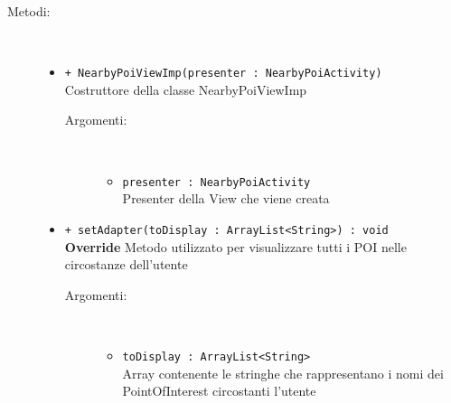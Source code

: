 \documentclass[../DefinizioneDiProdotto.tex]{subfiles}
\begin{document}
\begin{description}
\begin{itemize}
	\end{itemize}
	\item[Metodi:] \
	\begin{itemize}
		\item \texttt{+ NearbyPoiViewImp(presenter : NearbyPoiActivity)}\\
		Costruttore della classe NearbyPoiViewImp
		\begin{description}
			\item[Argomenti:] \
			\begin{itemize}
				\item \texttt{presenter : NearbyPoiActivity}\\
				Presenter della View che viene creata\end{itemize}
		\end{description}
		\item \texttt{+ setAdapter(toDisplay : ArrayList<String>) : void}\\
		\textbf{Override} Metodo utilizzato per visualizzare tutti i POI nelle circostanze dell'utente
		\begin{description}
			\item[Argomenti:] \
			\begin{itemize}
				\item \texttt{toDisplay : ArrayList<String>}\\
				Array contenente le stringhe che rappresentano i nomi dei PointOfInterest circostanti l'utente\end{itemize}
		\end{description}
	\end{itemize}
\end{description}
\end{document}
